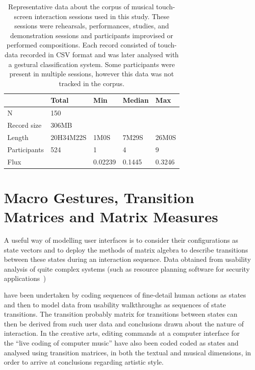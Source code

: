 \documentclass{sigchi}
\begin{document}





\begin{table}
\begin{tabular}{l|llll}
\hline
            & Total & Min  & Median   & Max     \\ 
\hline
N           & 150       &         &        &  \\
Record size & 306MB     &         &        &   \\
Length      & 20H34M22S & 1M0S    & 7M29S  & 26M0S\\
Participants& 524       & 1       & 4      & 9    \\
Flux        &           & 0.02239 & 0.1445 & 0.3246\\
\hline
\end{tabular}
\caption{
  Representative data about the corpus of musical touch-screen
  interaction sessions used in this study. These sessions were
  rehearsals, performances, studies, and demonstration sessions and 
  participants improvised or performed compositions. Each record
  consisted of touch-data recorded in CSV format and was later analysed
  with a gestural classification system. Some participants were
  present in multiple sessions, however this data was not tracked in
  the corpus.\label{corpus-table}}
\end{table}



\section{Macro Gestures, Transition Matrices and Matrix Measures}



A useful way of modelling user interfaces is to consider their
configurations as state vectors and to deploy the methods of matrix
algebra to describe transitions between these states during an
interaction sequence\cite{Thimbleby:2001kq, Thimbleby:2004fj}. Data
obtained from usability analysis of quite complex systems (such as 
resource planning software for security applications~\cite{Kannampallil:2007fp}) 

have been undertaken by coding sequences of fine-detail human actions
as states and then to model data from usability walkthroughs as
sequences of state transitions. The transition probably matrix for
transitions between states can then be derived from such user data and
conclusions drawn about the nature of interaction. In the creative
arts, editing commands at a computer interface for the ``live coding
of computer music'' have also been coded coded as states and analysed
using transition matrices, in both the textual and musical dimensions,
in order to arrive at conclusions regarding artistic
style\cite{Swift:2014tya}.
\end{document}
